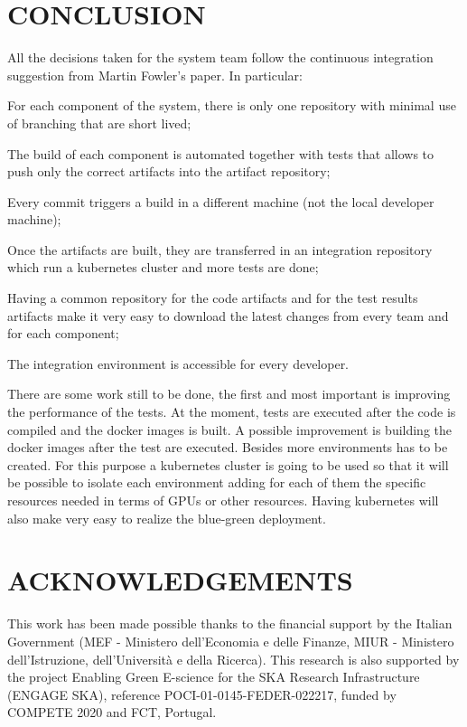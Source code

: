 \documentclass[a4paper,
               keeplastbox,   %
               ]{jacow}
\begin{document}
\section{CONCLUSION}
All the decisions taken for the system team follow the continuous integration suggestion from Martin Fowler’s paper. In particular: 
\begin{Itemize}
    \item For each component of the system, there is only one repository with minimal use of branching that are short lived;
    \item The build of each component is automated together with tests that allows to push only the correct artifacts into the artifact repository;
    \item Every commit triggers a build in a different machine (not the local developer machine);
    \item Once the artifacts are built, they are transferred in an integration repository which run a kubernetes cluster and more tests are done;
    \item Having a common repository for the code artifacts and for the test results artifacts make it very easy to download the latest changes from every team and for each component;
    \item The integration environment is accessible for every developer. 
\end{Itemize}

There are some work still to be done, the first and most important is improving the performance of the tests. At the moment, tests are executed after the code is compiled and the docker images is built. A possible improvement is building the docker images after the test are executed. Besides more environments has to be created. For this purpose a kubernetes cluster is going to be used so that it will be possible to isolate each environment adding for each of them the specific resources needed in terms of GPUs or other resources. Having kubernetes will also make very easy to realize the blue-green deployment.


\section{ACKNOWLEDGEMENTS}
This work has been made possible thanks to the financial support by the Italian Government (MEF - Ministero dell'Economia e delle Finanze, MIUR - Ministero dell'Istruzione, dell'Università e della Ricerca). This research is also supported by the project Enabling Green E-science for the SKA Research Infrastructure (ENGAGE SKA), reference POCI-01-0145-FEDER-022217, funded by COMPETE 2020 and FCT, Portugal.
\end{document}
